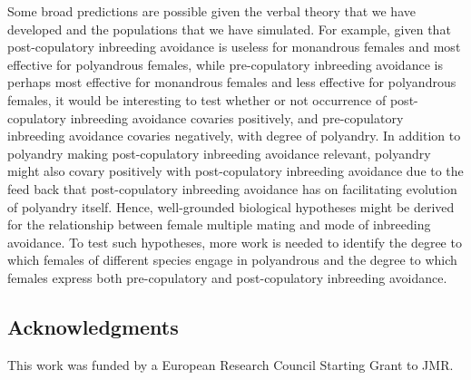 \documentclass[10pt,letterpaper]{article}
\begin{document}
Some broad predictions are possible given the verbal theory that we have developed and the populations that we have simulated. For example, given that post-copulatory inbreeding avoidance is useless for monandrous females and most effective for polyandrous females, while pre-copulatory inbreeding avoidance is perhaps most effective for monandrous females and less effective for polyandrous females, it would be interesting to test whether or not occurrence of post-copulatory inbreeding avoidance covaries positively, and pre-copulatory inbreeding avoidance covaries negatively, with degree of polyandry. In addition to polyandry making post-copulatory inbreeding avoidance relevant, polyandry might also covary positively with post-copulatory inbreeding avoidance due to the feed back that post-copulatory inbreeding avoidance has on facilitating evolution of polyandry itself. Hence, well-grounded biological hypotheses might be derived for the relationship between female multiple mating and mode of inbreeding avoidance. To test such hypotheses, more work is needed to identify the degree to which females of different species engage in polyandrous and the degree to which females express both pre-copulatory and post-copulatory inbreeding avoidance.


\subsection*{Acknowledgments}

This work was funded by a European Research Council Starting Grant to JMR. 

\begin{small}


\end{small}
\end{document}
